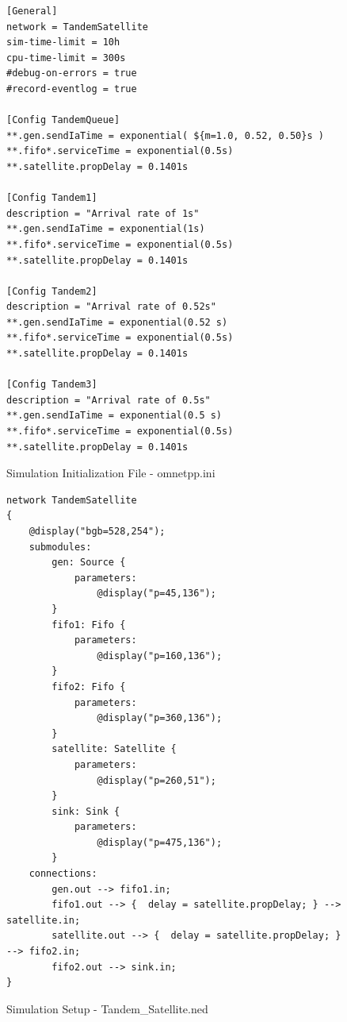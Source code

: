 \documentclass{article}
\begin{document}
\begin{figure}[h!]
\begin{lstlisting}
[General]
network = TandemSatellite
sim-time-limit = 10h
cpu-time-limit = 300s
#debug-on-errors = true
#record-eventlog = true

[Config TandemQueue]
**.gen.sendIaTime = exponential( ${m=1.0, 0.52, 0.50}s )
**.fifo*.serviceTime = exponential(0.5s)
**.satellite.propDelay = 0.1401s

[Config Tandem1]
description = "Arrival rate of 1s"
**.gen.sendIaTime = exponential(1s)
**.fifo*.serviceTime = exponential(0.5s)
**.satellite.propDelay = 0.1401s

[Config Tandem2]
description = "Arrival rate of 0.52s"
**.gen.sendIaTime = exponential(0.52 s)
**.fifo*.serviceTime = exponential(0.5s)
**.satellite.propDelay = 0.1401s

[Config Tandem3]
description = "Arrival rate of 0.5s"
**.gen.sendIaTime = exponential(0.5 s)
**.fifo*.serviceTime = exponential(0.5s)
**.satellite.propDelay = 0.1401s
\end{lstlisting}
\vspace{-1cm}
\caption*{Simulation Initialization File - omnetpp.ini}
\end{figure}

\newpage
\begin{figure}[h!]
\begin{lstlisting}
network TandemSatellite
{
    @display("bgb=528,254");
    submodules:
        gen: Source {
            parameters:
                @display("p=45,136");
        }
        fifo1: Fifo {
            parameters:
                @display("p=160,136");
        }
        fifo2: Fifo {
            parameters:
                @display("p=360,136");
        }
        satellite: Satellite {
            parameters:
                @display("p=260,51");
        }
        sink: Sink {
            parameters:
                @display("p=475,136");
        }
    connections:
        gen.out --> fifo1.in;
        fifo1.out --> {  delay = satellite.propDelay; } --> satellite.in;
        satellite.out --> {  delay = satellite.propDelay; } --> fifo2.in;
        fifo2.out --> sink.in;
}
\end{lstlisting}
\vspace{-1cm}
\caption*{Simulation Setup - Tandem\_Satellite.ned}
\end{figure}
\end{document}
